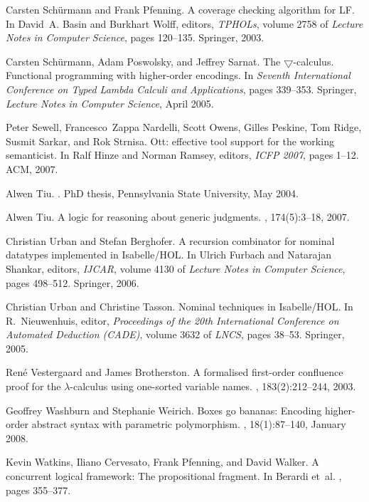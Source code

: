 \documentclass[final]{svjour3}
\begin{document}
\begin{thebibliography}{100}
Carsten Sch{\"u}rmann and Frank Pfenning.
\newblock A coverage checking algorithm for {LF}.
\newblock In David~A. Basin and Burkhart Wolff, editors, {\em TPHOLs}, volume
  2758 of {\em Lecture Notes in Computer Science}, pages 120--135. Springer,
  2003.

Carsten Sch{\"u}rmann, Adam Poswolsky, and Jeffrey Sarnat.
\newblock The $\bigtriangledown$-calculus. {F}unctional programming with
  higher-order encodings.
\newblock In {\em Seventh International Conference on Typed Lambda Calculi and
  Applications}, pages 339--353. Springer, {\em Lecture Notes in Computer
  Science}, April 2005.

Peter Sewell, Francesco~Zappa Nardelli, Scott Owens, Gilles Peskine, Tom Ridge,
  Susmit Sarkar, and Rok Strnisa.
\newblock Ott: effective tool support for the working semanticist.
\newblock In Ralf Hinze and Norman Ramsey, editors, {\em ICFP 2007}, pages
  1--12. ACM, 2007.

Alwen Tiu.
.
\newblock PhD thesis, Pennsylvania State University, May 2004.

Alwen Tiu.
\newblock A logic for reasoning about generic judgments.
, 174(5):3--18, 2007.

Christian Urban and Stefan Berghofer.
\newblock A recursion combinator for nominal datatypes implemented in
  {Isabelle/HOL}.
\newblock In Ulrich Furbach and Natarajan Shankar, editors, {\em IJCAR}, volume
  4130 of {\em Lecture Notes in Computer Science}, pages 498--512. Springer,
  2006.

Christian Urban and Christine Tasson.
\newblock Nominal techniques in {Isabelle/HOL}.
\newblock In R.~Nieuwenhuis, editor, {\em Proceedings of the 20th International
  Conference on Automated Deduction (CADE)}, volume 3632 of {\em LNCS}, pages
  38--53. Springer, 2005.

Ren{\'e} Vestergaard and James Brotherston.
\newblock A formalised first-order confluence proof for the $\lambda$-calculus
  using one-sorted variable names.
, 183(2):212--244, 2003.

Geoffrey Washburn and Stephanie Weirich.
\newblock Boxes go bananas: Encoding higher-order abstract syntax with
  parametric polymorphism.
, 18(1):87--140, January 2008.

Kevin Watkins, Iliano Cervesato, Frank Pfenning, and David Walker.
\newblock A concurrent logical framework: The propositional fragment.
\newblock In Berardi et~al. \cite{DBLP:conf/types/2003}, pages 355--377.

\end{thebibliography}
\end{document}

